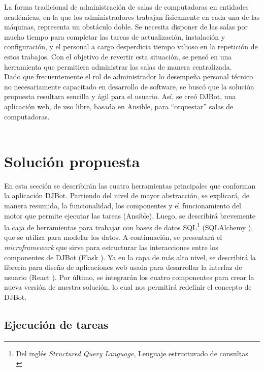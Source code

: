 \documentclass[a4paper,12pt]{article}
\begin{document}
La forma tradicional de administración de salas de computadoras en entidades académicas, en la que los administradores trabajan físicamente en cada una de las máquinas, representa un obstáculo doble. Se necesita disponer de las salas por mucho tiempo para completar las tareas de actualización, instalación y configuración, y el personal a cargo desperdicia tiempo valioso en la repetición de estos trabajos. Con el objetivo de revertir esta situación, se pensó en una herramienta que permitiera administrar las salas de manera centralizada.\\

Dado que frecuentemente el rol de administrador lo desempeña personal técnico no necesariamente capacitado en desarrollo de software, se buscó que la solución propuesta resultara sencilla y ágil para el usuario. Así, se creó DJBot, una aplicación web, de uso libre, basada en Ansible,  para “orquestar” salas de computadoras.\\



\newpage\\
\section{Solución propuesta}
\label{sec:orgheadline19}
En esta sección se describirán las cuatro herramientas principales que conforman la aplicación DJBot. Partiendo del nivel de mayor abstracción, se explicará, de manera resumida, la funcionalidad, los componentes y el funcionamiento del motor que permite ejecutar las tareas (Ansible). Luego, se describirá brevemente la caja de herramientas para trabajar con bases de datos SQL\footnote{Del inglés \emph{Structured Query Language}, Lenguaje estructurado de consultas\\} (SQLAlchemy \cite{SQLalchemy}), que se utiliza para modelar los datos. A continuación, se presentará el \emph{microframework} que sirve para estructurar las interacciones entre los componentes de DJBot (Flask \cite{Flask}). Ya en la capa de más alto nivel, se describirá la librería para diseño de aplicaciones web usada para desarrollar la interfaz de usuario (React \cite{React}). Por último, se integrarán los cuatro componentes para crear la nueva versión de nuestra solución, lo cual nos permitirá redefinir el concepto de DJBot.\\

\subsection{Ejecución de tareas}
\label{sec:orgheadline14}
\end{document}
